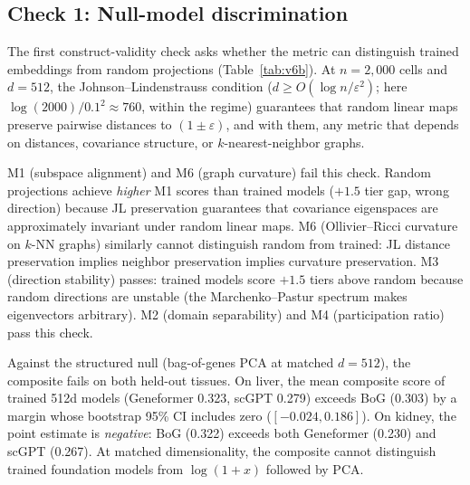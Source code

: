 \documentclass[9pt,lineno]{elife}
\begin{document}
\subsection{Check 1: Null-model discrimination}

The first construct-validity check asks whether the metric can distinguish trained embeddings from random projections (Table~\ref{tab:v6b}). At $n = 2{,}000$ cells and $d = 512$, the Johnson--Lindenstrauss condition ($d \geq O(\log n / \varepsilon^2)$; here $\log(2000) / 0.1^2 \approx 760$, within the regime) guarantees that random linear maps preserve pairwise distances to $(1 \pm \varepsilon)$, and with them, any metric that depends on distances, covariance structure, or $k$-nearest-neighbor graphs.

M1 (subspace alignment) and M6 (graph curvature) fail this check. Random projections achieve \emph{higher} M1 scores than trained models ($+1.5$ tier gap, wrong direction) because JL preservation guarantees that covariance eigenspaces are approximately invariant under random linear maps. M6 (Ollivier--Ricci curvature on $k$-NN graphs) similarly cannot distinguish random from trained: JL distance preservation implies neighbor preservation implies curvature preservation. M3 (direction stability) passes: trained models score $+1.5$ tiers above random because random directions are unstable (the Marchenko--Pastur spectrum makes eigenvectors arbitrary). M2 (domain separability) and M4 (participation ratio) pass this check.

Against the structured null (bag-of-genes PCA at matched $d = 512$), the composite fails on both held-out tissues. On liver, the mean composite score of trained 512d models (Geneformer 0.323, scGPT 0.279) exceeds BoG (0.303) by a margin whose bootstrap 95\% CI includes zero ($[-0.024, 0.186]$). On kidney, the point estimate is \emph{negative}: BoG (0.322) exceeds both Geneformer (0.230) and scGPT (0.267). At matched dimensionality, the composite cannot distinguish trained foundation models from $\log(1+x)$ followed by PCA.
\end{document}
